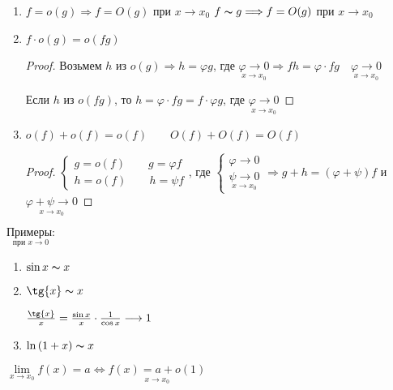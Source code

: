 \begin{enumerate}
\begin{proof}
        $g \thicksim f \Longleftrightarrow g = f + o(f) \Longleftrightarrow f = g + o(f)$
    \end{proof}

    \item $f = o(g) \Longrightarrow f = O(g)$ при $x \longrightarrow x_0$
    $f \thicksim g \Longrightarrow f = O(g)$ при $x \longrightarrow x_0$

    \item $f \cdot o(g) = o(fg)$
    
    \begin{proof}
        Возьмем $h$ из $o(g) \Longrightarrow h = \varphi g$, где $\underset{x \longrightarrow x_0}{\varphi \longrightarrow 0}
        \Longrightarrow fh = \varphi \cdot fg \quad \underset{x \longrightarrow x_0}{\varphi \longrightarrow 0}$

        Если $h$ из $o(fg)$, то $h = \varphi \cdot fg = f \cdot \varphi g$, где 
        $\underset{x \longrightarrow x_0}{\varphi \longrightarrow 0}$
    \end{proof}

    \item $o(f) + o(f) = o(f) \qquad O(f) + O(f) = O(f)$
    
    \begin{proof} \quad

        $\begin{cases}
            g = o(f) \qquad g = \varphi f \\
            h = o(f) \qquad h = \psi f
        \end{cases}$, где $\begin{cases}
            \varphi \longrightarrow 0 \\
            \underset{x \longrightarrow x_0}{\psi \longrightarrow 0}
        \end{cases} \Longrightarrow g + h = (\varphi + \psi)f$ и $\underset{x \longrightarrow x_0}{\varphi + \psi \longrightarrow 0}$
    \end{proof}
\end{enumerate}

$\underset{\text{при } x \longrightarrow 0}{\textbf{Примеры:}}$
\begin{enumerate}
    \item $\sin{x} \thicksim x$
    \item $\tg{x} \thicksim x$
    
    $\frac{\tg{x}}{x} = \frac{\sin{x}}{x} \cdot \frac{1}{\cos{x}} \longrightarrow 1$
    \item$\ln{(1+x)} \thicksim x$
\end{enumerate}
\notice $\lim\limits_{x \rightarrow x_0}{f(x) = a} \Longleftrightarrow \underset{x \longrightarrow x_0}{f(x) = a + o(1)}$

